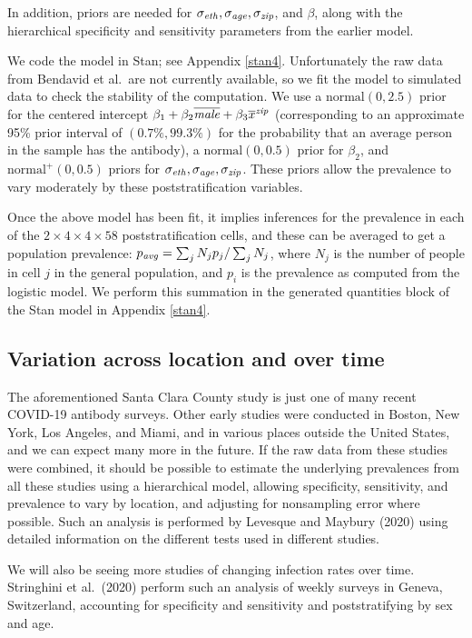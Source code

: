 \documentclass[11pt]{article}
\begin{document}
In addition, priors are needed for $\sigma_{\it eth}, \sigma_{\it age},\sigma_{\it zip}$, and $\beta$, along with the hierarchical specificity and sensitivity parameters from the earlier model.

We code the model in Stan; see Appendix \ref{stan4}.  Unfortunately the raw data from Bendavid et al.\  are not currently available, so we fit the model to simulated data to check the stability of the computation.  We use a $\mbox{normal}(0,2.5)$ prior for the centered intercept  $\beta_1 + \beta_2\overline{\it male} + \beta_3\overline{x}^{\it zip}$ (corresponding to an approximate 95\% prior interval of $(0.7\%, 99.3\%)$ for the probability that an average person in the sample has the antibody), a $\mbox{normal}(0,0.5)$ prior for $\beta_2$, and $\mbox{normal}^+(0, 0.5)$ priors for $\sigma_{\it eth}, \sigma_{\it age},\sigma_{\it zip}$.  These priors allow the prevalence to vary moderately by these poststratification variables.

Once the above model has been fit, it implies inferences for the prevalence in each of the $2\times 4 \times 4 \times 58$ poststratification cells, and these can be averaged to get a population prevalence:  $p_{\it avg} = \sum_jN_jp_j/\sum_jN_j$, where $N_j$ is the number of people in cell $j$ in the general population, and $p_i$ is the prevalence as computed from the logistic model.  We perform this summation in the generated quantities block of the Stan model in Appendix \ref{stan4}.

\subsection{Variation across location and over time}\label{muiltiple}
The aforementioned Santa Clara County study is just one of many recent COVID-19 antibody surveys.  Other early studies were conducted in Boston, New York, Los Angeles, and Miami, and in various places outside the United States, and we can expect many more in the future.  If the raw data from these studies were combined, it should be possible to estimate the underlying prevalences from all these studies using a hierarchical model, allowing specificity, sensitivity, and prevalence to vary by location, and adjusting for nonsampling error where possible.  Such an analysis is performed by Levesque and Maybury (2020) using detailed information on the different tests used in different studies.

We will also be seeing more studies of changing infection rates over time.  Stringhini et al.\ (2020) perform such an analysis of weekly surveys in Geneva, Switzerland, accounting for specificity and sensitivity and poststratifying by sex and age.
\end{document}
